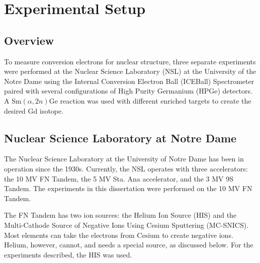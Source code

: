 %
%
%
%
%
%
%
%
%
%


%
%

\chapter{Experimental Setup}
\label{chap:setup}

\section{Overview}

To measure conversion electrons for nuclear structure, three separate experiments were performed at the Nuclear Science Laboratory (NSL) at the University of the Notre Dame using the Internal Conversion Electron Ball (ICEBall) Spectrometer paired with several configurations of High Purity Germanium (HPGe) detectors. A Sm$(\alpha,2n)$Ge reaction was used with different enriched targets to create the desired Gd isotope.

\section{Nuclear Science Laboratory at Notre Dame}

The Nuclear Science Laboratory at the University of Notre Dame has been in operation since the 1930s. Currently, the NSL operates with three accelerators: the 10 MV FN Tandem, the 5 MV Sta. Ana accelerator, and the 3 MV 9S Tandem. The experiments in this dissertation were performed on the 10 MV FN Tandem.

The FN Tandem has two ion sources: the Helium Ion Source (HIS) and the Multi-Cathode Source of Negative Ions Using Cesium Sputtering (MC-SNICS). Most elements can take the electrons from Cesium to create negative ions. Helium, however, cannot, and needs a special source, as discussed below. For the experiments described, the HIS was used.

